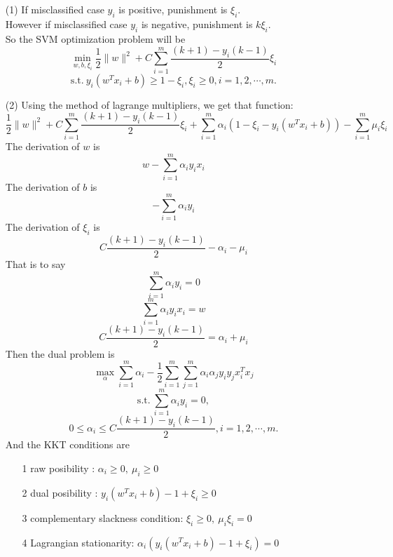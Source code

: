 \begin{solution}
    \begin{enumerate}
        \item[(1)]
            If misclassified case $y_i$ is positive, punishment is $\xi_i$.\\ However if misclassified case $y_i$ is negative, punishment is $k\xi_i$.\\
            So the SVM optimization problem will be
            \[\min_{w,b,\xi_{i}}\frac{1}{2}\|w\|^2+C\sum_{i=1}^{m}\frac{(k+1)-y_i(k-1)}{2}\xi_i\]
            \[\mathrm{s.t.}~ y_i(w^Tx_i+b)\geq 1-\xi_i, \xi_i\geq 0,i=1,2,\cdots,m.\]
        \item[(2)] Using the method of lagrange multipliers, we get that function:
            \[\frac{1}{2}\|w\|^2+C\sum_{i=1}^{m}\frac{(k+1)-y_i(k-1)}{2}\xi_i+\sum_{i=1}^m\alpha_{i}(1-\xi_i-y_i(w^Tx_i+b))-\sum_{i=1}^{m}\mu_i\xi_i\]
            The derivation of $w$ is \[w-\sum_{i=1}^{m}\alpha_iy_ix_i\]
            The derivation of $b$ is \[-\sum_{i=1}^{m}\alpha_iy_i\]
            The derivation of $\xi_i$ is \[C\frac{(k+1)-y_i(k-1)}{2}-\alpha_i-\mu_i\]
            That is to say
            \[
                \sum_{i=1}^{m}\alpha_iy_i=0
            \]
            \[
                \sum_{i=1}^{m}\alpha_iy_ix_i=w
            \]
            \[
                C\frac{(k+1)-y_i(k-1)}{2}=\alpha_i+\mu_i
            \]
            Then the dual problem is
            \[\max_{\alpha}\sum_{i=1}^{m}\alpha_i-\frac{1}{2}\sum_{i=1}^{m}\sum_{j=1}^{m}\alpha_i\alpha_jy_iy_jx_i^Tx_j\]
            \[\mathrm{s.t.}~ \sum_{i=1}^m\alpha_iy_i=0,\]
            \[0\leq \alpha_i\leq C\frac{(k+1)-y_i(k-1)}{2},i=1,2,\cdots,m.\]
            And the KKT conditions are
            \begin{enumerate}
                \item[1] raw posibility : $\alpha_i\geq 0,~ \mu_i\geq 0$
                \item[2] dual posibility : $y_i(w^Tx_i+b)-1+\xi_i\geq 0$
                \item[3] complementary slackness condition: $\xi_i\geq 0,~ \mu_i\xi_i=0$
                \item[4] Lagrangian stationarity: $\alpha_i(y_i(w^Tx_i+b)-1+\xi_{i})=0$
            \end{enumerate}
    \end{enumerate}
\end{solution}
